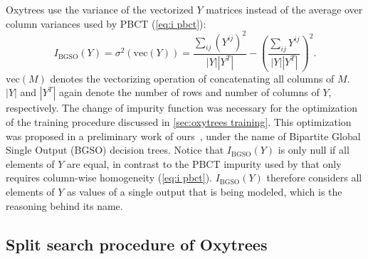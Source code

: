 \documentclass[sn-mathphys-num]{sn-jnl}%
\theoremstyle{thmstyleone}%
\theoremstyle{thmstyletwo}%
\theoremstyle{thmstylethree}%
\begin{document}
Oxytrees use the variance of the vectorized $Y$ matrices instead of the average over column variances used by PBCT (\autoref{eq:i pbct}):
%
\begin{equation}
    \label{eq:i bgso}
    I_\text{BGSO} (Y) = \sigma^2(\text{vec}(Y))
    = \frac{\sum_{ij}(Y^{ij})^2}{|Y||Y^T|} - \left(\frac{\sum_{ij}Y^{ij}}{|Y||Y^T|}\right)^2
    \text{.}
\end{equation}
%
$\text{vec}(M)$ denotes the vectorizing operation of concatenating all columns of $M$. $|Y|$ and $|Y^T|$ again denote the number of rows and number of columns of $Y$, respectively.
The change of impurity function was necessary for the optimization of the training procedure discussed in \autoref{sec:oxytrees training}. This optimization was proposed in a preliminary work of ours~\cite{ilidio_fast_2024}, under the name of Bipartite Global Single Output (BGSO) decision trees.
%
Notice that $I_\text{BGSO}(Y)$ is only null if all elements of $Y$ are equal, in contrast to the PBCT impurity used by \cite{pliakos_global_2018} that only requires column-wise homogeneity (\autoref{eq:i pbct}). $I_\text{BGSO}(Y)$ therefore considers all elements of $Y$ as values of a single output that is being modeled, which is the reasoning behind its name.




\subsection{Split search procedure of Oxytrees}
\label{sec:oxytrees training}
\end{document}

